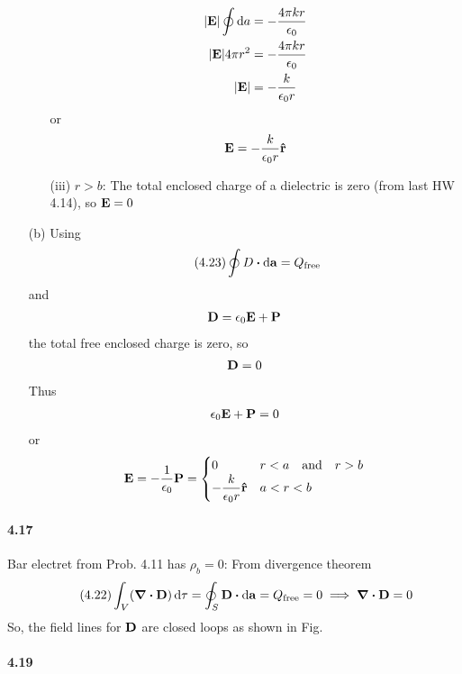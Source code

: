 \documentclass[../main.tex]{subfiles}
\begin{document}
\begin{itemize}
\begin{itemize}
\begin{align*}
            \abs{\vb E} \oint \dd{a} &= -\frac{4\pi k r}{\epsilon_0} \\
            \abs{\vb E} 4\pi r^2 &= -\frac{4\pi k r}{\epsilon_0} \\
            \abs{\vb E} &= -\frac{k}{\epsilon_0 r} 
        \end{align*}
        or 
        \begin{align*}
            \vb E = -\frac{k}{\epsilon_0 r} \vu r
        \end{align*}
        \item [(iii)] $r > b$: The total enclosed charge of a dielectric is zero (from last HW 4.14), so $\vb E = 0$
    \end{itemize}
    \item [(b)] Using
    \begin{align*} \tag{4.23}\label{eq:4.23}
        \oint D \vdot \dd{\vb a} = Q_\text{free}
    \end{align*}
    and 
    \begin{align*}
        \vb D = \epsilon_0 \vb E + \vb P
    \end{align*}
    the total free enclosed charge is zero, so
    \begin{align*}
        \vb D = 0
    \end{align*}
    Thus
    \begin{align*}
        \epsilon_0 \vb E + \vb P = 0 
    \end{align*}
    or
    \begin{align*}
        \vb E = -\frac{1}{\epsilon_0} \vb P = \begin{cases}
            0 & r < a \qand r > b \\
            -\dfrac{k}{\epsilon_0 r} \vu r & a < r < b
        \end{cases}
    \end{align*}
\end{itemize}

\newpage
\paragraph{4.17} Bar electret from Prob. 4.11 has $\rho_b = 0$: From divergence theorem
\begin{align*}\tag{4.22}
    \int_V (\div \vb D) \dd{\tau} = \oint_S \vb D \vdot \dd{\vb a} = Q_\text{free} = 0 \implies \div \vb D = 0
\end{align*}
So, the field lines for $\vb D$ are closed loops as shown in Fig.

\newpage
\paragraph{4.19}
\end{document}
